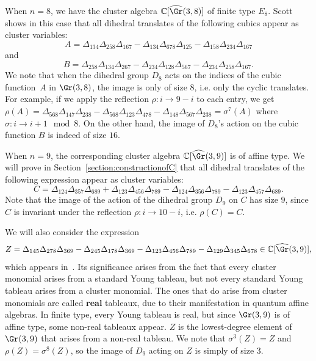 When $n=8$, we have the cluster algebra $\mathbb{C}[\widehat{\Gr}(3,8)]$ of finite type $E_8$. Scott shows in this case that all dihedral translates of the following cubics appear as cluster variables:
\[A=\Delta_{134}\Delta_{258}\Delta_{167}-\Delta_{134}\Delta_{678}\Delta_{125}-\Delta_{158}\Delta_{234}\Delta_{167}\]
and
\[B=\Delta_{258}\Delta_{134}\Delta_{267}-\Delta_{234}\Delta_{128}\Delta_{567}-\Delta_{234}\Delta_{258}\Delta_{167}.\]
We note that when the dihedral group $D_8$ acts on the indices of the cubic function~$A$ in $\Gr(3,8)$, the image is only of size $8$, i.e. only the cyclic translates.  For example, if we apply the reflection $\rho : i \to 9-i$ to each entry, we get $\rho(A) = \Delta_{568}\Delta_{147}\Delta_{238}-\Delta_{568}\Delta_{123}\Delta_{478}-\Delta_{148}\Delta_{567}\Delta_{238} = \sigma^7(A)$ where $\sigma : i \to i+1 \mod 8$.  On the other hand, the image of $D_8$'s action on the cubic function $B$ is indeed of size $16$. 

When $n=9$, the corresponding cluster algebra $\mathbb{C}[\widehat{\Gr}(3,9)]$ is of affine type. We will prove in Section~\ref{section:constructionofC} that all dihedral translates of the following expression appear as cluster variables:
\[C = \Delta_{124}\Delta_{357}\Delta_{689}+\Delta_{123}\Delta_{456}\Delta_{789}-\Delta_{124}\Delta_{356}\Delta_{789}-\Delta_{123}\Delta_{457}\Delta_{689}.\]
Note that the image of the action of the dihedral group $D_9$ on $C$ has size $9$, since $C$ is invariant under the reflection $\rho: i \to 10-i$, i.e. $\rho(C)=C$.

We will also consider the expression
\[Z= \Delta_{145}\Delta_{278}\Delta_{369}-\Delta_{245}\Delta_{178}\Delta_{369}-\Delta_{123}\Delta_{456}\Delta_{789}-\Delta_{129}\Delta_{345}\Delta_{678} \in \mathbb{C}[\widehat{\Gr}(3,9)],\]
which appears in~\cite[Example~8.1]{quantum20}. Its significance arises from the fact that every cluster monomial arises from a standard Young tableau, but not every standard Young tableau arises from a cluster monomial. The ones that do arise from cluster monomials are called {\bf real} tableaux, due to their manifestation in quantum affine algebras. In finite type, every Young tableau is real, but since $\Gr(3,9)$ is of affine type, some non-real tableaux appear. $Z$ is the lowest-degree element of $\Gr(3,9)$ that arises from a non-real tableau. We note that $\sigma^3(Z)=Z$ and $\rho(Z) = \sigma^8(Z)$, so the image of $D_9$ acting on $Z$ is simply of size $3$.

